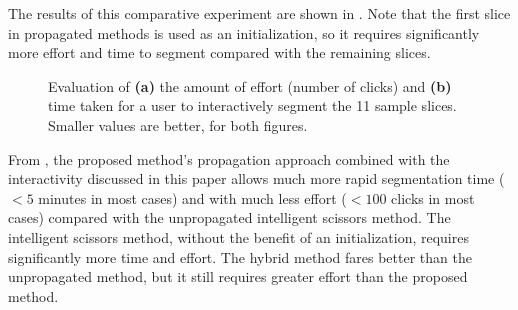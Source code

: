 \documentclass[]{spie}  %
\begin{document}
The results of this comparative experiment are shown in .
Note that the first slice in propagated methods is used as an
initialization, so it requires significantly more effort and time to
segment compared with the remaining slices.
\begin{figure}[htbp]
\centering
{}
\hspace{0.1em}
\caption{Evaluation of \textbf{(a)} the amount of effort (number of
  clicks) and \textbf{(b)} time taken for a user to interactively
  segment the 11 sample slices.  Smaller values are better, for both
  figures.} \label{fig:ex}
\end{figure}
From , the proposed method's propagation approach combined
with the interactivity discussed in this paper allows much more rapid
segmentation time ($< 5$ minutes in most cases) and with much less
effort ($< 100$ clicks in most cases) compared with the unpropagated
intelligent scissors method.  The intelligent scissors method, without
the benefit of an initialization, requires significantly more time and
effort.  The hybrid method fares better than the unpropagated method,
but it still requires greater effort than the proposed method.
\end{document}
